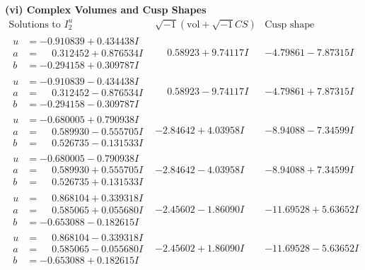 \documentclass[1p]{elsarticle_modified}
\theoremstyle{definition}
\newcommand{\I}{\sqrt{-1}}
\begin{document}
\newpage\flushleft \textbf{(vi) Complex Volumes and Cusp Shapes}
$$\begin{array}{c|c|c}  
\text{Solutions to }I^u_{2}& \I (\text{vol} + \sqrt{-1}CS) & \text{Cusp shape}\\
 \hline 
\begin{aligned}
u &= -0.910839 + 0.434438 I \\
a &= \phantom{-}0.312452 + 0.876534 I \\
b &= -0.294158 + 0.309787 I\end{aligned}
 & \phantom{-}0.58923 + 9.74117 I & -4.79861 - 7.87315 I \\ \hline\begin{aligned}
u &= -0.910839 - 0.434438 I \\
a &= \phantom{-}0.312452 - 0.876534 I \\
b &= -0.294158 - 0.309787 I\end{aligned}
 & \phantom{-}0.58923 - 9.74117 I & -4.79861 + 7.87315 I \\ \hline\begin{aligned}
u &= -0.680005 + 0.790938 I \\
a &= \phantom{-}0.589930 - 0.555705 I \\
b &= \phantom{-}0.526735 - 0.131533 I\end{aligned}
 & -2.84642 + 4.03958 I & -8.94088 - 7.34599 I \\ \hline\begin{aligned}
u &= -0.680005 - 0.790938 I \\
a &= \phantom{-}0.589930 + 0.555705 I \\
b &= \phantom{-}0.526735 + 0.131533 I\end{aligned}
 & -2.84642 - 4.03958 I & -8.94088 + 7.34599 I \\ \hline\begin{aligned}
u &= \phantom{-}0.868104 + 0.339318 I \\
a &= \phantom{-}0.585065 + 0.055680 I \\
b &= -0.653088 - 0.182615 I\end{aligned}
 & -2.45602 - 1.86090 I & -11.69528 + 5.63652 I \\ \hline\begin{aligned}
u &= \phantom{-}0.868104 - 0.339318 I \\
a &= \phantom{-}0.585065 - 0.055680 I \\
b &= -0.653088 + 0.182615 I\end{aligned}
 & -2.45602 + 1.86090 I & -11.69528 - 5.63652 I \\ \hline\begin{aligned}

\end{aligned}
\end{array}$$
\end{document}
